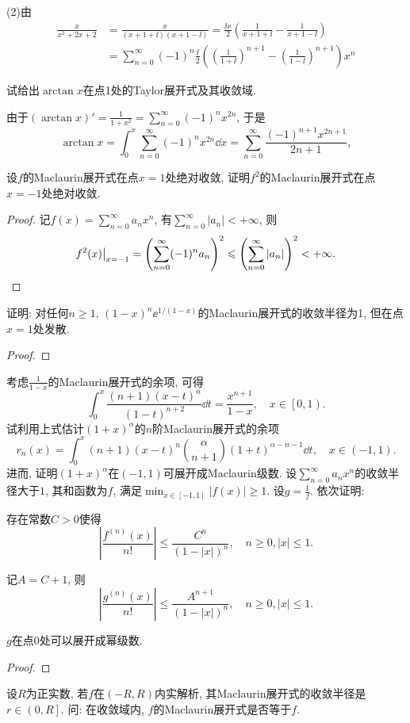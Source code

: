 \begin{quiza}
\begin{solution}
(2)由\[\begin{split}
\frac{x}{x^2+2x+2}&=\frac{x}{(x+1+\ii)(x+1-\ii)}=\frac{\ii x}{2}\left(\frac{1}{x+1+\ii}-\frac{1}{x+1-\ii}\right)\\&=\sum_{n=0}^{\infty}(-1)^n\frac{\ii}{2}\left(\left(\frac{1}{1+\ii}\right)^{n+1}-\left(\frac{1}{1-\ii}\right)^{n+1}\right)x^n
\end{split}\]
\end{solution}
\woe 试给出\(\arctan x\)在点1处的Taylor展开式及其收敛域.
\begin{solution}
由于\(\left(\arctan x\right)'=\frac{1}{1+x^2}=\sum_{n=0}^{\infty}(-1)^nx^{2n}\), 于是\[\arctan x=\int_{0}^{x}\sum_{n=0}^{\infty}(-1)^nx^{2n}\dd x=\sum_{n=0}^{\infty}\frac{(-1)^{n+1}x^{2n+1}}{2n+1},\]
\end{solution}
\woe 设\(f\)的Maclaurin展开式在点\(x=1\)处绝对收敛, 证明\(f^2\)的Maclaurin展开式在点\(x=-1\)处绝对收敛.
\begin{proof}
记\(f(x)=\sum_{n=0}^{\infty}a_nx^n\), 有\(\sum_{n=0}^{\infty}\left|a_n\right|<+\infty\), 则\[f^2(x)\big|_{x=-1}=\left(\sum_{n=0}^{\infty}(-1)^na_n\right)^2\leqslant\left(\sum_{n=0}^{\infty}|a_n|\right)^2<+\infty.\qedhere\]
\end{proof}
\woe 证明: 对任何\(n\geqslant 1,\,(1-x)^n\ee^{1/(1-x)}\)的Maclaurin展开式的收敛半径为1, 但在点\(x=1\)处发散.
\begin{proof}

\end{proof}
\woe 考虑\(\frac{1}{1-x}\)的Maclaurin展开式的余项, 可得\[\int_{0}^{x}\frac{(n+1)(x-t)^n}{(1-t)^{n+2}}\dd t=\frac{x^{n+1}}{1-x},\quad x\in\left[0,1\right).\]试利用上式估计\((1+x)^\alpha\)的\(n\)阶Maclaurin展开式的余项\[r_n(x)=\int_{0}^{x}(n+1)(x-t)^n\binom{\alpha}{n+1}(1+t)^{\alpha-n-1}\dd t,\quad x\in(-1,1).\]进而, 证明\((1+x)^\alpha\)在\((-1,1)\)可展开成Maclaurin级数.
\woe 设\(\sum_{n=0}^{\infty}a_nx^n\)的收敛半径大于\(1\), 其和函数为\(f\), 满足\(\min_{x\in [-1,1]}\left|f(x)\right|\geqslant 1\). 设\(g=\frac{1}{f}\). 依次证明:
\begin{quizs}
\item 存在常数\(C>0\)使得\[\left|\frac{f^{(n)}(x)}{n!}\right|\leqslant \frac{C^n}{(1-\left|x\right|)^n},\quad n\geqslant 0,\left|x\right|\leqslant 1.\]
\item 记\(A=C+1\), 则\[\left|\frac{g^{(n)}(x)}{n!}\right|\leqslant\frac{A^{n+1}}{(1-\left|x\right|)^n},\quad n\geqslant 0,\left|x\right|\leqslant 1.\]
\item \(g\)在点0处可以展开成幂级数.
\end{quizs}
\begin{proof}

\end{proof}
\woe 设\(R\)为正实数, 若\(f\)在\((-R,R)\)内实解析, 其Maclaurin展开式的收敛半径是\(r\in \left(0,R\right]\). 问: 在收敛域内, \(f\)的Maclaurin展开式是否等于\(f\).
\begin{solution}

\end{solution}
\end{quiza}
